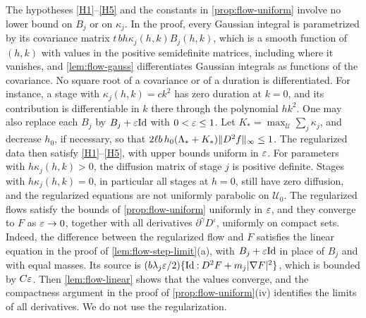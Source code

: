 \begin{remark}
\label{rem:flow-regularization}
The hypotheses \ref{H1}--\ref{H5} and the constants in \cref{prop:flow-uniform}
involve no lower bound on $B_j$ or on $\kappa_j$. In the proof, every Gaussian
integral is parametrized by its covariance matrix
$t\,bh\kappa_j(h,k)B_j(h,k)$, which is a smooth function of $(h,k)$ with values
in the positive semidefinite matrices, including where it vanishes, and
\cref{lem:flow-gauss} differentiates Gaussian integrals as functions of the
covariance. No square root of a covariance or of a duration is differentiated.
For instance, a stage with $\kappa_j(h,k)=ck^2$ has zero duration at $k=0$, and
its contribution is differentiable in $k$ there through the polynomial $hk^2$.
One may also replace each $B_j$ by $B_j+\varepsilon\mathrm{Id}$ with $0<\varepsilon\le1$. Let
$K_*=\max_{\mathcal U}\sum_j\kappa_j$, and decrease $h_0$, if necessary, so that
$2\ell b\,h_0(\Lambda_*+K_*)\lVert D^2f\rVert_\infty\le1$. The regularized data then
satisfy \ref{H1}--\ref{H5}, with upper bounds uniform in $\varepsilon$. For parameters
with $h\kappa_j(h,k)>0$, the diffusion matrix of stage $j$ is positive definite.
Stages with $h\kappa_j(h,k)=0$, in particular all stages at $h=0$, still have zero
diffusion, and the regularized equations are not uniformly parabolic on
$\mathcal U_0$. The
regularized flows satisfy the bounds of \cref{prop:flow-uniform} uniformly in
$\varepsilon$, and they converge to $F$ as $\varepsilon\to0$, together with all derivatives
$\partial^\gamma D^\iota$, uniformly on compact sets. Indeed, the difference
between the regularized flow and $F$ satisfies the linear equation in the proof
of \cref{lem:flow-step-limit}(a), with $B_j+\varepsilon\mathrm{Id}$ in place of $B_j$ and with
equal masses. Its source is
$(b\lambda_j\varepsilon/2)\{\mathrm{Id}\mathbin{:}D^2F+m_j\lvert \nabla F\rvert^2\}$, which is bounded
by $C\varepsilon$. Then \cref{lem:flow-linear} shows that the values
converge, and the compactness argument in the proof of
\cref{prop:flow-uniform}(iv) identifies the limits of all derivatives. We do not
use the regularization.
\end{remark}

